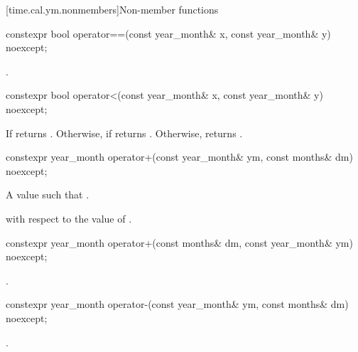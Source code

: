 [time.cal.ym.nonmembers]{Non-member functions}

%
\begin{itemdecl}
constexpr bool operator==(const year_month& x, const year_month& y) noexcept;
\end{itemdecl}

\begin{itemdescr}
\pnum
\returns {}.
\end{itemdescr}

%
\begin{itemdecl}
constexpr bool operator<(const year_month& x, const year_month& y) noexcept;
\end{itemdecl}

\begin{itemdescr}
\pnum
\returns
If  returns .
Otherwise, if  returns .
Otherwise, returns .
\end{itemdescr}

%
\begin{itemdecl}
constexpr year_month operator+(const year_month& ym, const months& dm) noexcept;
\end{itemdecl}

\begin{itemdescr}
\pnum
\returns A  value  such that .

\complexity
{} with respect to the value of .
\end{itemdescr}

%
\begin{itemdecl}
constexpr year_month operator+(const months& dm, const year_month& ym) noexcept;
\end{itemdecl}

\begin{itemdescr}
\pnum
\returns {}.
\end{itemdescr}

%
\begin{itemdecl}
constexpr year_month operator-(const year_month& ym, const months& dm) noexcept;
\end{itemdecl}

\begin{itemdescr}
\pnum
\returns {}.
\end{itemdescr}

